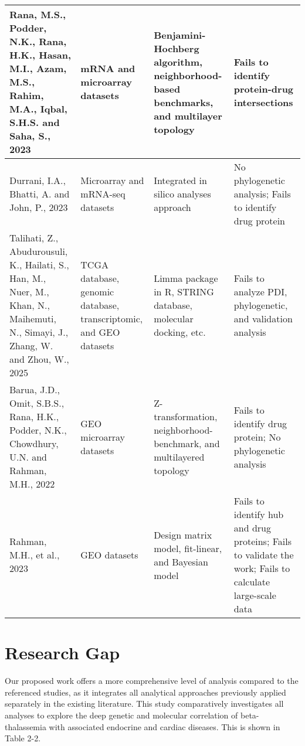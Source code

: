 \begin{longtable}{|p{3.8cm}|p{2.5cm}|p{3.4cm}|p{3.4cm}|}
\hline
Rana, M.S., Podder, N.K., Rana, H.K., Hasan, M.I., Azam, M.S., Rahim, M.A., Iqbal, S.H.S. and Saha, S., 2023 \cite{b10} & mRNA and microarray datasets & Benjamini-Hochberg algorithm, neighborhood-based benchmarks, and multilayer topology & Fails to identify protein-drug intersections \\
\hline
Durrani, I.A., Bhatti, A. and John, P., 2023 \cite{b13} & Microarray and mRNA-seq datasets & Integrated in silico analyses approach & No phylogenetic analysis; Fails to identify drug protein \\
\hline
Talihati, Z., Abudurousuli, K., Hailati, S., Han, M., Nuer, M., Khan, N., Maihemuti, N., Simayi, J., Zhang, W. and Zhou, W., 2025 \cite{b14} & TCGA database, genomic database, transcriptomic, and GEO datasets & Limma package in R, STRING database, molecular docking, etc. & Fails to analyze PDI, phylogenetic, and validation analysis \\
\hline
Barua, J.D., Omit, S.B.S., Rana, H.K., Podder, N.K., Chowdhury, U.N. and Rahman, M.H., 2022 \cite{b19} & GEO microarray datasets & Z-transformation, neighborhood-benchmark, and multilayered topology & Fails to identify drug protein; No phylogenetic analysis \\
\hline
Rahman, M.H., et al., 2023 \cite{b25} & GEO datasets & Design matrix model, fit-linear, and Bayesian model & Fails to identify hub and drug proteins; Fails to validate the work; Fails to calculate large-scale data \\
\hline
\end{longtable}

\section{Research Gap}
\label{sec:sec2_3}
Our proposed work offers a more comprehensive level of analysis compared to the referenced studies, as it integrates all analytical approaches previously applied separately in the existing literature. This study comparatively investigates all analyses to explore the deep genetic and molecular correlation of beta-thalassemia with associated endocrine and cardiac diseases. This is shown in Table 2-2.

